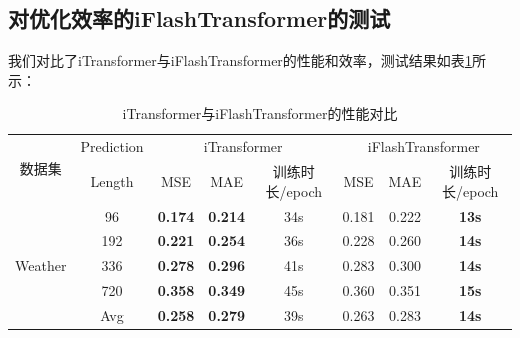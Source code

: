 \documentclass[twoside,12pt]{article}
\begin{document}
\subsection{对优化效率的iFlashTransformer的测试}
我们对比了iTransformer与iFlashTransformer的性能和效率，测试结果如表\ref{tab:itransformer_vs_iflashtransformer}所示：
\begin{table}[htbp]
  \caption{\small{iTransformer与iFlashTransformer的性能对比}}
  \label{tab:itransformer_vs_iflashtransformer}
  \vspace{5pt}
  \centering
  \begin{tabular}{c|c|ccc|ccc}
    \toprule
    \multirow{2}{*}{数据集}  & Prediction & \multicolumn{3}{c|}{iTransformer} & \multicolumn{3}{c}{iFlashTransformer}                                                   \\
    \cmidrule(lr){3-4} \cmidrule(lr){5-6}
                             & Length     & MSE                               & MAE                                   & 训练时长/epoch & MSE   & MAE   & 训练时长/epoch \\
    \midrule
    \multirow{5}{*}{Weather} & 96         & \textbf{0.174}                    & \textbf{0.214}                        & 34s            & 0.181 & 0.222 & \textbf{13s}   \\
                             & 192        & \textbf{0.221}                    & \textbf{0.254}                        & 36s            & 0.228 & 0.260 & \textbf{14s}   \\
                             & 336        & \textbf{0.278}                    & \textbf{0.296}                        & 41s            & 0.283 & 0.300 & \textbf{14s}   \\
                             & 720        & \textbf{0.358}                    & \textbf{0.349}                        & 45s            & 0.360 & 0.351 & \textbf{15s}   \\
    \cmidrule(lr){2-6}
                             & Avg        & \textbf{0.258}                    & \textbf{0.279}                        & 39s            & 0.263 & 0.283 & \textbf{14s}   \\
    \bottomrule
    \bottomrule
  \end{tabular}
\end{table}

\newpage
\end{document}
